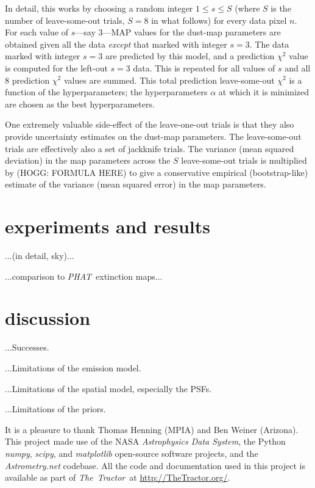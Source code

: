 \documentclass[12pt,pdftex,preprint]{aastex}
\newcommand{\project}[1]{\textsl{#1}}
\newcommand{\TheTractor}{\project{The~Tractor}}
\newcommand{\PHAT}{\project{PHAT}}
\begin{document}
In detail, this works by choosing a random integer $1\leq s\leq S$
(where $S$ is the number of leave-some-out trials, $S=8$ in what
follows) for every data pixel $n$.  For each value of $s$---say
3---MAP values for the dust-map parameters are obtained given all the
data \emph{except} that marked with integer $s=3$.  The data marked
with integer $s=3$ are predicted by this model, and a prediction
$\chi^2$ value is computed for the left-out $s=3$ data.  This is
repeated for all values of $s$ and all 8 prediction $\chi^2$ values
are summed.  This total prediction leave-some-out $\chi^2$ is a
function of the hyperparameters; the hyperparameters $\alpha$ at which
it is minimized are chosen as the best hyperparameters.

One extremely valuable side-effect of the leave-one-out trials is that
they also provide uncertainty estimates on the dust-map parameters.
The leave-some-out trials are effectively also a set of jackknife
trials.  The variance (mean squared deviation) in the map parameters
across the $S$ leave-some-out trials is multiplied by (HOGG: FORMULA
HERE) to give a conservative empirical (bootstrap-like) estimate of
the variance (mean squared error) in the map parameters.

\section{experiments and results}

...(in detail, sky)...

...comparison to \PHAT\ extinction maps...

\section{discussion}

...Successes.

...Limitations of the emission model.

...Limitations of the spatial model, especially the PSFs.

...Limitations of the priors.

\acknowledgements It is a pleasure to thank Thomas Henning (MPIA) and
Ben Weiner (Arizona).  This project made use of the NASA
\project{Astrophysics Data System}, the Python \project{numpy},
\project{scipy}, and \project{matplotlib} open-source software
projects, and the \project{Astrometry.net} codebase.  All the code and
documentation used in this project is available as part of
\TheTractor\ at \url{http://TheTractor.org/}.
\end{document}
